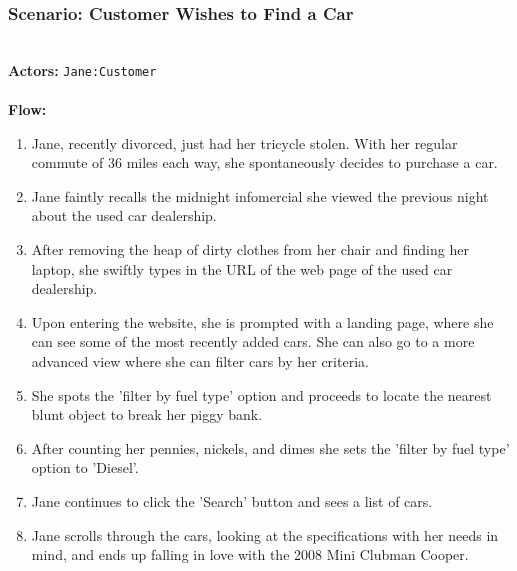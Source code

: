 \subsubsection{Scenario: Customer Wishes to Find a Car}
\HRule \\[0.4cm]
\textbf{Actors:} \texttt{Jane:Customer}\\
\HRule \\[0.4cm]
\textbf{Flow:} \\
\begin{enumerate}
 \item Jane, recently divorced, just had her tricycle stolen. With her regular commute of 36 miles each way, she spontaneously decides to purchase a car.
 \item Jane faintly recalls the midnight infomercial she viewed the previous night about the used car dealership.
 \item After removing the heap of dirty clothes from her chair and finding her laptop, she swiftly types in the URL of the web page of the used car dealership.
 \item Upon entering the website, she is prompted with a landing page, where she can see some of the most recently added cars. She can also go to a more advanced view where she can filter cars by her criteria.
 \item She spots the 'filter by fuel type' option and proceeds to locate the nearest blunt object to break her piggy bank.
 \item After counting her pennies, nickels, and dimes she sets the 'filter by fuel type' option to 'Diesel'.
 \item Jane continues to click the 'Search' button and sees a list of cars.
 \item Jane scrolls through the cars, looking at the specifications with her needs in mind, and ends up falling in love with the 2008 Mini Clubman Cooper.
\end{enumerate}
\HRule \\[0.4cm]
